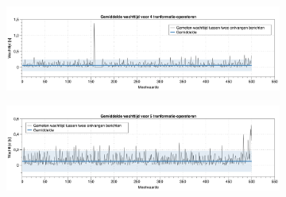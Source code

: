 \documentclass[twocolumn, a4paper]{article}
\begin{document}
\begin{figure}[htb]
    \begin{subfigure}{0.88\textwidth}
        \centering
        \includegraphics[width=\textwidth]{4_operator}        
    \end{subfigure}
    \begin{subfigure}{0.88\textwidth}
        \centering
        \includegraphics[width=\textwidth]{5_operator}        
    \end{subfigure}  
\end{figure}

\newpage

\end{document}

